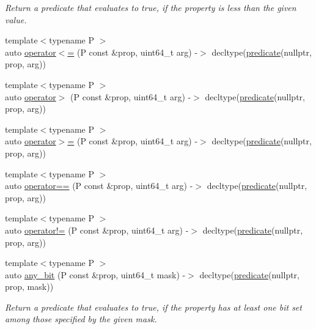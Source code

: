 \begin{DoxyCompactItemize}
\begin{DoxyCompactList}\small\item\em Return a predicate that evaluates to {\ttfamily true}, if the property is less than the given value. \end{DoxyCompactList}\item 
{\footnotesize template$<$typename P $>$ }\\auto \hyperlink{namespacepfq_1_1lang_a39d99d5ec8bb46ebe6efa8c3816376e3}{operator$<$=} (P const \&prop, uint64\+\_\+t arg) -\/$>$ decltype(\hyperlink{namespacepfq_1_1lang_aca9adafc436b7f851621b979fa1aaf88}{predicate}(nullptr, prop, arg))
\item 
{\footnotesize template$<$typename P $>$ }\\auto \hyperlink{namespacepfq_1_1lang_ac8b5cd4322fa1de4ec52e8356e9fbee8}{operator$>$} (P const \&prop, uint64\+\_\+t arg) -\/$>$ decltype(\hyperlink{namespacepfq_1_1lang_aca9adafc436b7f851621b979fa1aaf88}{predicate}(nullptr, prop, arg))
\item 
{\footnotesize template$<$typename P $>$ }\\auto \hyperlink{namespacepfq_1_1lang_ad5ca0642e91360ee35beecfb31b62b6d}{operator$>$=} (P const \&prop, uint64\+\_\+t arg) -\/$>$ decltype(\hyperlink{namespacepfq_1_1lang_aca9adafc436b7f851621b979fa1aaf88}{predicate}(nullptr, prop, arg))
\item 
{\footnotesize template$<$typename P $>$ }\\auto \hyperlink{namespacepfq_1_1lang_a055e29efb9299750331375acb2082056}{operator==} (P const \&prop, uint64\+\_\+t arg) -\/$>$ decltype(\hyperlink{namespacepfq_1_1lang_aca9adafc436b7f851621b979fa1aaf88}{predicate}(nullptr, prop, arg))
\item 
{\footnotesize template$<$typename P $>$ }\\auto \hyperlink{namespacepfq_1_1lang_a6b68f3f983df3797675371e11b14cc06}{operator!=} (P const \&prop, uint64\+\_\+t arg) -\/$>$ decltype(\hyperlink{namespacepfq_1_1lang_aca9adafc436b7f851621b979fa1aaf88}{predicate}(nullptr, prop, arg))
\item 
{\footnotesize template$<$typename P $>$ }\\auto \hyperlink{namespacepfq_1_1lang_ac247c3827084d381d8518dabfff43bb2}{any\+\_\+bit} (P const \&prop, uint64\+\_\+t mask) -\/$>$ decltype(\hyperlink{namespacepfq_1_1lang_aca9adafc436b7f851621b979fa1aaf88}{predicate}(nullptr, prop, mask))
\begin{DoxyCompactList}\small\item\em Return a predicate that evaluates to {\ttfamily true}, if the property has at least one bit set among those specified by the given mask. \end{DoxyCompactList}\item 

\end{DoxyCompactItemize}
